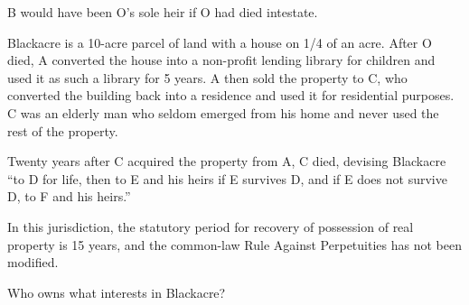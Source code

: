 B would have been O's sole heir if O had died intestate.

Blackacre is a 10-acre parcel of land with a house on 1/4 of an acre. After O 
died, A converted the house into a non-profit lending library for children and 
used it as such a library for 5 years. A then sold the property to C, who 
converted the building back into a residence and used it for residential 
purposes. C was an elderly man who seldom emerged from his home and never used 
the rest of the property.

Twenty years after C acquired the property from A, C died, devising Blackacre 
``to D for life, then to E and his heirs if E survives D, and if E does not 
survive D, to F and his heirs.''

In this jurisdiction, the statutory period for recovery of possession of real 
property is 15 years, and the common-law Rule Against Perpetuities has not 
been modified.

Who owns what interests in Blackacre?

